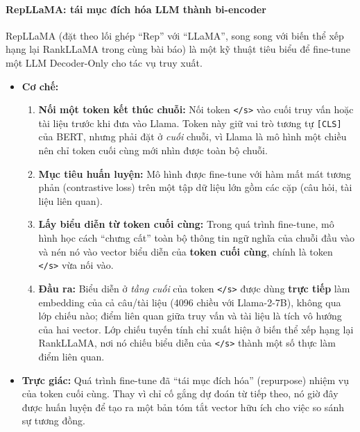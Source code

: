 \paragraph{RepLLaMA: tái mục đích hóa LLM thành bi-encoder}
RepLLaMA \cite{ma2023repllama} (đặt theo lối ghép “Rep” với “LLaMA”, song song với biến thể xếp hạng lại RankLLaMA trong cùng bài báo) là một kỹ thuật tiêu biểu để fine-tune một LLM Decoder-Only cho tác vụ truy xuất.
\begin{itemize}
	\item \textbf{Cơ chế:}
	\begin{enumerate}
		\item \textbf{Nối một token kết thúc chuỗi:} Nối token \texttt{</s>} vào cuối truy vấn hoặc tài liệu trước khi đưa vào Llama. Token này giữ vai trò tương tự \texttt{[CLS]} của BERT, nhưng phải đặt ở \textit{cuối} chuỗi, vì Llama là mô hình một chiều nên chỉ token cuối cùng mới nhìn được toàn bộ chuỗi.
		\item \textbf{Mục tiêu huấn luyện:} Mô hình được fine-tune với hàm mất mát tương phản (contrastive loss) trên một tập dữ liệu lớn gồm các cặp (câu hỏi, tài liệu liên quan).
		\item \textbf{Lấy biểu diễn từ token cuối cùng:} Trong quá trình fine-tune, mô hình học cách “chưng cất” toàn bộ thông tin ngữ nghĩa của chuỗi đầu vào và nén nó vào vector biểu diễn của \textbf{token cuối cùng}, chính là token \texttt{</s>} vừa nối vào.
		\item \textbf{Đầu ra:} Biểu diễn ở \textit{tầng cuối} của token \texttt{</s>} được dùng \textbf{trực tiếp} làm embedding của cả câu/tài liệu (4096 chiều với Llama-2-7B), không qua lớp chiếu nào; điểm liên quan giữa truy vấn và tài liệu là tích vô hướng của hai vector. Lớp chiếu tuyến tính chỉ xuất hiện ở biến thể xếp hạng lại RankLLaMA, nơi nó chiếu biểu diễn của \texttt{</s>} thành một số thực làm điểm liên quan.
	\end{enumerate}
	\item \textbf{Trực giác:} Quá trình fine-tune đã “tái mục đích hóa” (repurpose) nhiệm vụ của token cuối cùng. Thay vì chỉ cố gắng dự đoán từ tiếp theo, nó giờ đây được huấn luyện để tạo ra một bản tóm tắt vector hữu ích cho việc so sánh sự tương đồng.
\end{itemize}

